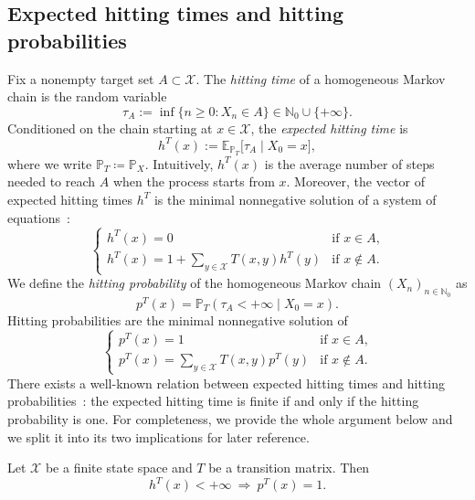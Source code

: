 \documentclass{svproc}
\newcommand{\X}{\mathcal{X}}
\newcommand{\N}{\mathbb{N}}
\newcommand{\PP}{\mathbb{P}}
\newcommand{\EE}{\mathbb{E}}
\begin{document}
\subsection{Expected hitting times and hitting probabilities}\label{sec:expected}
Fix a nonempty target set $A\subset\X$. The \textit{hitting time} of a homogeneous Markov chain is the random variable 
\begin{equation}
      \tau_A :=\inf\{n\ge0: X_n\in A\}\in\N_0\cup\{+\infty\}.
\end{equation} 
Conditioned on the chain starting at $x\in\X$, the \emph{expected hitting time} is
\begin{equation}
  h^T(x):=\EE_{\PP_T}\bigl[\tau_A \mid X_0=x\bigr],
\end{equation}
where we write $\PP_T\coloneqq \PP_X$. 
Intuitively, $h^T(x)$ is the average number of steps needed to reach $A$ when the process starts from $x$. Moreover, the vector of expected hitting times $h^T$ is the minimal nonnegative solution of a system of equations~\cite{norrisbook1997markov}:
\begin{equation*}
\begin{cases}
    h^T(x)=0&\text{if $x\in A$,}\\
     h^T(x)=1+\textstyle\sum\limits_{y\in \X}T(x,y)h^T(y)&\text{if $x\notin A$.}
\end{cases}
\end{equation*}
We define the \textit{hitting probability} of the homogeneous Markov chain $(X_n)_{n\in\N_0}$ as
\begin{equation}
    p^T(x)=\PP_T(\tau_A<+\infty\mid X_0=x).
\end{equation}
Hitting probabilities are the minimal nonnegative solution of
\begin{equation*}
    \begin{cases}
        p^T(x)=1&\text{if $x\in A$,}\\
        p^T(x)=\textstyle\sum\limits_{y\in \X}T(x,y)p^T(y)&\text{if $x\notin A$.}
    \end{cases}
\end{equation*}
There exists a well-known relation between expected hitting times and hitting probabilities~\cite{levin2009markov, norrisbook1997markov}: the expected hitting time is finite if and only if the hitting probability is one. For completeness, we provide the whole argument below and we split it into its two implications for later reference.
\begin{proposition}\label{prop:rightimpl}
    Let $\X$ be a finite state space and $T$ be a transition matrix. Then 
    \begin{equation}
        h^T(x)<+\infty \ \Rightarrow \ p^T(x)=1.
    \end{equation}
\end{proposition}
\end{document}
